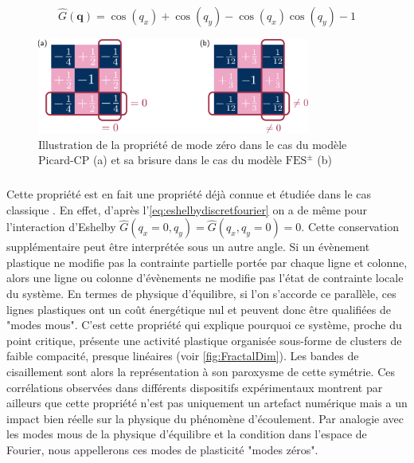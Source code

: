 \begin{equation}
	\hat{G}(\mathbf{q}) = \cos(q_x) + \cos(q_y) -\cos(q_x)\cos(q_y) -1
\end{equation}

\begin{figure}[h]
	\centering
	\includegraphics[width = 0.8\textwidth]{Chapitre4/Figures/CourtePortee/ZMCP.pdf}
	\caption{Illustration de la propriété de mode zéro dans le cas du modèle Picard-CP (a) et sa brisure dans le cas du modèle $\text{FES}^\pm$ (b)}
	\label{fig:Omodesshortrange}
\end{figure}

\subparagraph{}Cette propriété est en fait une propriété déjà connue et étudiée dans le cas classique \cite{tyukodi_depinning_2016, ferrero_elastic_2019}. En effet, d'après l'\autoref{eq:eshelbydiscretfourier} on a de même pour l'interaction d'Eshelby $\hat{G}(q_x=0,q_y)=\hat{G}(q_x,q_y=0)=0$. Cette conservation supplémentaire peut être interprétée sous un autre angle. Si un évènement plastique ne modifie pas la contrainte partielle portée par chaque ligne et colonne, alors une ligne ou colonne d'évènements ne modifie pas l'état de contrainte locale du système. En termes de physique d'équilibre, si l'on s'accorde ce parallèle, ces lignes plastiques ont un coût énergétique nul et peuvent donc être qualifiées de "modes mous". C'est cette propriété qui explique pourquoi ce système, proche du point critique, présente une activité plastique organisée sous-forme de clusters de faible compacité, presque linéaires (voir \autoref{fig:FractalDim}). Les bandes de cisaillement \cite{martens_spontaneous_2012, rossi_finite-disorder_2022} sont alors la représentation à son paroxysme de cette symétrie. Ces corrélations observées dans différents dispositifs expérimentaux montrent par ailleurs que cette propriété n'est pas uniquement un artefact numérique mais a un impact bien réelle sur la physique du phénomène d'écoulement. Par analogie avec les modes mous de la physique d'équilibre et la condition dans l'espace de Fourier, nous appellerons ces modes de plasticité "modes zéros". 

